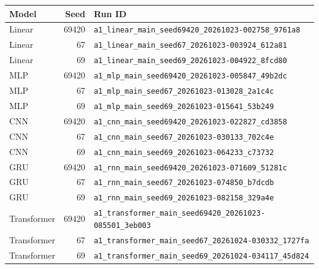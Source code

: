 \begin{tabular}{lrl}
\toprule
Model & Seed & Run ID \\
\midrule
Linear & 69420 & \texttt{a1\_linear\_main\_seed69420\_20261023-002758\_9761a8} \\
Linear & 67 & \texttt{a1\_linear\_main\_seed67\_20261023-003924\_612a81} \\
Linear & 69 & \texttt{a1\_linear\_main\_seed69\_20261023-004922\_8fcd80} \\
MLP & 69420 & \texttt{a1\_mlp\_main\_seed69420\_20261023-005847\_49b2dc} \\
MLP & 67 & \texttt{a1\_mlp\_main\_seed67\_20261023-013028\_2a1c4c} \\
MLP & 69 & \texttt{a1\_mlp\_main\_seed69\_20261023-015641\_53b249} \\
CNN & 69420 & \texttt{a1\_cnn\_main\_seed69420\_20261023-022827\_cd3858} \\
CNN & 67 & \texttt{a1\_cnn\_main\_seed67\_20261023-030133\_702c4e} \\
CNN & 69 & \texttt{a1\_cnn\_main\_seed69\_20261023-064233\_c73732} \\
GRU & 69420 & \texttt{a1\_rnn\_main\_seed69420\_20261023-071609\_51281c} \\
GRU & 67 & \texttt{a1\_rnn\_main\_seed67\_20261023-074850\_b7dcdb} \\
GRU & 69 & \texttt{a1\_rnn\_main\_seed69\_20261023-082158\_329a4e} \\
Transformer & 69420 & \texttt{a1\_transformer\_main\_seed69420\_20261023-085501\_3eb003} \\
Transformer & 67 & \texttt{a1\_transformer\_main\_seed67\_20261024-030332\_1727fa} \\
Transformer & 69 & \texttt{a1\_transformer\_main\_seed69\_20261024-034117\_45d824} \\
\bottomrule
\end{tabular}
